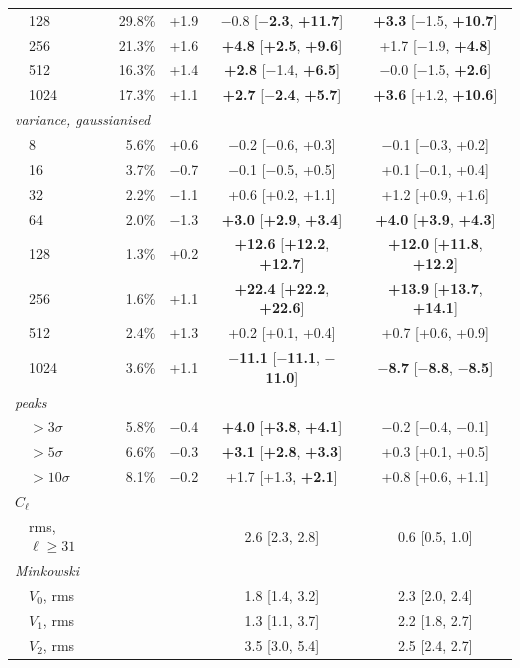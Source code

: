 \begin{table}
\begin{tabular}{llrrcc}
 & 128 & 29.8\% & +1.9 & $-$0.8 [\textbf{$-$2.3}, \textbf{+11.7}] & \textbf{+3.3} [$-$1.5, \textbf{+10.7}] \\
 & 256 & 21.3\% & +1.6 & \textbf{+4.8} [\textbf{+2.5}, \textbf{+9.6}] & +1.7 [$-$1.9, \textbf{+4.8}] \\
 & 512 & 16.3\% & +1.4 & \textbf{+2.8} [$-$1.4, \textbf{+6.5}] & $-$0.0 [$-$1.5, \textbf{+2.6}] \\
 & 1024 & 17.3\% & +1.1 & \textbf{+2.7} [\textbf{$-$2.4}, \textbf{+5.7}] & \textbf{+3.6} [+1.2, \textbf{+10.6}] \\
\hline
\multicolumn{6}{l}{\emph{variance, gaussianised}} \\
 & 8 & 5.6\% & +0.6 & $-$0.2 [$-$0.6, +0.3] & $-$0.1 [$-$0.3, +0.2] \\
 & 16 & 3.7\% & $-$0.7 & $-$0.1 [$-$0.5, +0.5] & +0.1 [$-$0.1, +0.4] \\
 & 32 & 2.2\% & $-$1.1 & +0.6 [+0.2, +1.1] & +1.2 [+0.9, +1.6] \\
 & 64 & 2.0\% & $-$1.3 & \textbf{+3.0} [\textbf{+2.9}, \textbf{+3.4}] & \textbf{+4.0} [\textbf{+3.9}, \textbf{+4.3}] \\
 & 128 & 1.3\% & +0.2 & \textbf{+12.6} [\textbf{+12.2}, \textbf{+12.7}] & \textbf{+12.0} [\textbf{+11.8}, \textbf{+12.2}] \\
 & 256 & 1.6\% & +1.1 & \textbf{+22.4} [\textbf{+22.2}, \textbf{+22.6}] & \textbf{+13.9} [\textbf{+13.7}, \textbf{+14.1}] \\
 & 512 & 2.4\% & +1.3 & +0.2 [+0.1, +0.4] & +0.7 [+0.6, +0.9] \\
 & 1024 & 3.6\% & +1.1 & \textbf{$-$11.1} [\textbf{$-$11.1}, \textbf{$-$11.0}] & \textbf{$-$8.7} [\textbf{$-$8.8}, \textbf{$-$8.5}] \\
\hline
\multicolumn{6}{l}{\emph{peaks}} \\
 & $>3\sigma$ & 5.8\% & $-$0.4 & \textbf{+4.0} [\textbf{+3.8}, \textbf{+4.1}] & $-$0.2 [$-$0.4, $-$0.1] \\
 & $>5\sigma$ & 6.6\% & $-$0.3 & \textbf{+3.1} [\textbf{+2.8}, \textbf{+3.3}] & +0.3 [+0.1, +0.5] \\
 & $>10\sigma$ & 8.1\% & $-$0.2 & +1.7 [+1.3, \textbf{+2.1}] & +0.8 [+0.6, +1.1] \\
\hline
\multicolumn{6}{l}{\emph{$C_\ell$}} \\
 & rms, $\ell\geq31$ &  &  & 2.6 [2.3, 2.8] & 0.6 [0.5, 1.0] \\
\hline
\multicolumn{6}{l}{\emph{Minkowski}} \\
 & $V_0$, rms &  &  & 1.8 [1.4, 3.2] & 2.3 [2.0, 2.4] \\
 & $V_1$, rms &  &  & 1.3 [1.1, 3.7] & 2.2 [1.8, 2.7] \\
 & $V_2$, rms &  &  & 3.5 [3.0, 5.4] & 2.5 [2.4, 2.7] \\
\hline
\end{tabular}
\end{table}
